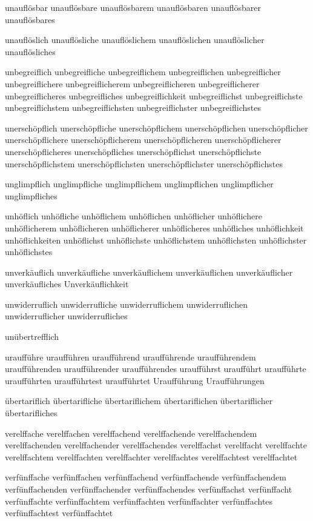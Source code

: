unauflösbar unauflösbare unauflösbarem unauflösbaren unauflösbarer unauflösbares

unauflöslich unauflösliche unauflöslichem unauflöslichen unauflöslicher unauflösliches

unbegreiflich unbegreifliche unbegreiflichem unbegreiflichen unbegreiflicher unbegreiflichere unbegreiflicherem unbegreiflicheren unbegreiflicherer unbegreiflicheres unbegreifliches unbegreiflichkeit unbegreiflichst unbegreiflichste unbegreiflichstem unbegreiflichsten unbegreiflichster unbegreiflichstes

unerschöpflich unerschöpfliche unerschöpflichem unerschöpflichen unerschöpflicher unerschöpflichere unerschöpflicherem unerschöpflicheren unerschöpflicherer unerschöpflicheres unerschöpfliches unerschöpflichst unerschöpflichste unerschöpflichstem unerschöpflichsten unerschöpflichster unerschöpflichstes

unglimpflich unglimpfliche unglimpflichem unglimpflichen unglimpflicher unglimpfliches

unhöflich unhöfliche unhöflichem unhöflichen unhöflicher unhöflichere unhöflicherem unhöflicheren unhöflicherer unhöflicheres unhöfliches unhöflichkeit unhöflichkeiten unhöflichst unhöflichste unhöflichstem unhöflichsten unhöflichster unhöflichstes

unverkäuflich unverkäufliche unverkäuflichem unverkäuflichen unverkäuflicher unverkäufliches Unverkäuflichkeit

unwiderruflich unwiderrufliche unwiderruflichem unwiderruflichen unwiderruflicher unwiderrufliches

unübertrefflich

uraufführe uraufführen uraufführend uraufführende uraufführendem uraufführenden uraufführender uraufführendes uraufführst uraufführt uraufführte uraufführten uraufführtest uraufführtet Uraufführung Uraufführungen

übertariflich übertarifliche übertariflichem übertariflichen übertariflicher übertarifliches

verelffache verelffachen verelffachend verelffachende verelffachendem verelffachenden verelffachender verelffachendes verelffachst verelffacht verelffachte verelffachtem verelffachten verelffachter verelffachtes verelffachtest verelffachtet

verfünffache verfünffachen verfünffachend verfünffachende verfünffachendem verfünffachenden verfünffachender verfünffachendes verfünffachst verfünffacht verfünffachte verfünffachtem verfünffachten verfünffachter verfünffachtes verfünffachtest verfünffachtet

